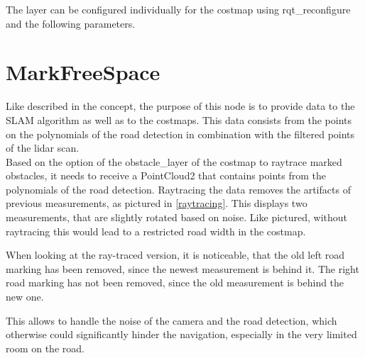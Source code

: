 The layer can be configured individually for the costmap using rqt\_reconfigure and the following parameters.




\begin{table} 
\centering
{}
\label{dynlayerparams}
\caption{dynamic\_cost\_layer parameters}
\end{table}




\section{MarkFreeSpace}

Like described in the concept, the purpose of this node is to provide data to the SLAM algorithm as well as to the costmaps. This data consists from the points on the polynomials of the road detection in combination with the filtered points of the lidar scan.\\
Based on the option of the obstacle\_layer of the costmap to raytrace marked obstacles, it needs to receive a PointCloud2 that contains points from the polynomials of the road detection. Raytracing the data removes the artifacts of previous measurements, as pictured in \ref{raytracing}. 
This displays two measurements, that are slightly rotated based on noise. Like pictured, without raytracing this would lead to a restricted road width in the costmap.

When looking at the ray-traced version, it is noticeable, that the old left road marking has been removed, since the newest measurement is behind it. The right road marking has not been removed, since the old measurement is behind the new one.

This allows to handle the noise of the camera and the road detection, which otherwise could significantly hinder the navigation, especially in the very limited room on the road.

